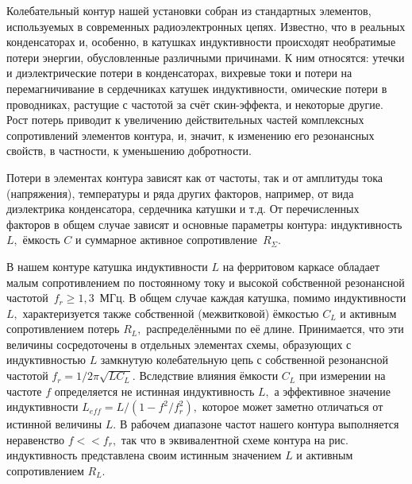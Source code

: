 Колебательный контур нашей установки собран из стандартных элементов, используемых в современных радиоэлектронных цепях. Известно, что в реальных конденсаторах и, особенно, в катушках индуктивности происходят необратимые потери энергии, обусловленные различными причинами. К ним относятся: утечки и диэлектрические потери в конденсаторах, вихревые токи и потери на перемагничивание в сердечниках катушек индуктивности, омические потери в проводниках, растущие с частотой за счёт скин-эффекта, и некоторые другие. Рост потерь приводит к увеличению действительных частей комплексных сопротивлений элементов контура, и, значит, к изменению его резонансных свойств, в частности, к уменьшению добротности.

Потери в элементах контура зависят как от частоты, так и от амплитуды тока (напряжения), температуры и ряда других факторов, например, от вида диэлектрика конденсатора, сердечника катушки и т.д. От перечисленных факторов в общем случае зависят и основные параметры контура: индуктивность $L,$ ёмкость $C$ и суммарное активное сопротивление~$R_{\Sigma}.$

В нашем контуре катушка индуктивности $L$ на ферритовом каркасе обладает малым сопротивлением по постоянному току и высокой собственной резонансной частотой~$f_r\ge1,3$~МГц. В общем случае каждая катушка, помимо индуктивности $L,$ характеризуется также собственной (межвитковой) ёмкостью $C_L$ и активным сопротивлением потерь $R_L,$ распределёнными по её длине. Принимается, что эти величины сосредоточены в отдельных элементах схемы, образующих с индуктивностью $L$ замкнутую колебательную цепь с собственной резонансной частотой  $f_r=1/2\pi\sqrt{LC_L}.$ Вследствие влияния ёмкости $C_L$ при измерении на частоте $f$ определяется не истинная индуктивность $L,$ а эффективное значение индуктивности $L_{eff}=L/(1-f^2/f_r^2),$ которое может заметно отличаться от истинной величины $L.$ В рабочем диапазоне частот нашего контура выполняется неравенство $f<<f_r,$ так что в эквивалентной схеме контура на рис.~ индуктивность представлена своим истинным значением $L$ и активным сопротивлением $R_L.$

